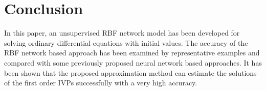 \section{Conclusion}

In this paper, an unsupervised RBF network model has been developed for solving ordinary differential equations with initial values. The accuracy of the RBF network based approach has been examined by representative examples and compared with some previously proposed neural network based approaches. It has been shown that the proposed approximation method can estimate the solutions of the first order IVPs successfully with a very high accuracy.





%
%



